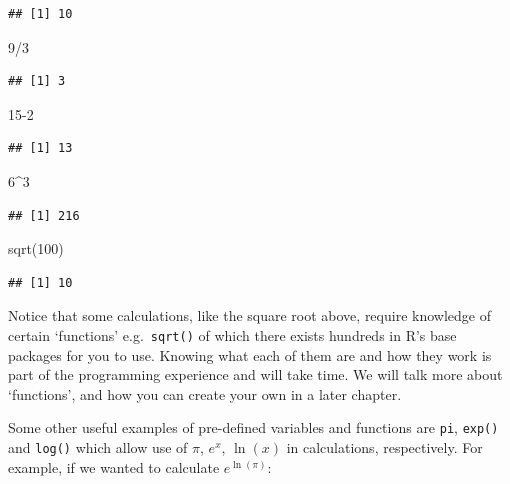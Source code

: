 \documentclass[
]{book}
\newenvironment{Shaded}{\begin{snugshade}}{\end{snugshade}}
\newcommand{\DecValTok}[1]{\textcolor[rgb]{0.00,0.00,0.81}{#1}}
\newcommand{\FunctionTok}[1]{\textcolor[rgb]{0.00,0.00,0.00}{#1}}
\newcommand{\NormalTok}[1]{#1}
\newcommand{\SpecialCharTok}[1]{\textcolor[rgb]{0.00,0.00,0.00}{#1}}
\theoremstyle{definition}
\theoremstyle{definition}
\theoremstyle{definition}
\theoremstyle{definition}
\theoremstyle{remark}
\begin{document}
\begin{verbatim}
## [1] 10
\end{verbatim}

\begin{Shaded}
\begin{Highlighting}[]
\DecValTok{9}\SpecialCharTok{/}\DecValTok{3}
\end{Highlighting}
\end{Shaded}

\begin{verbatim}
## [1] 3
\end{verbatim}

\begin{Shaded}
\begin{Highlighting}[]
\DecValTok{15{-}2}
\end{Highlighting}
\end{Shaded}

\begin{verbatim}
## [1] 13
\end{verbatim}

\begin{Shaded}
\begin{Highlighting}[]
\DecValTok{6}\SpecialCharTok{\^{}}\DecValTok{3}
\end{Highlighting}
\end{Shaded}

\begin{verbatim}
## [1] 216
\end{verbatim}

\begin{Shaded}
\begin{Highlighting}[]
\FunctionTok{sqrt}\NormalTok{(}\DecValTok{100}\NormalTok{)}
\end{Highlighting}
\end{Shaded}

\begin{verbatim}
## [1] 10
\end{verbatim}

Notice that some calculations, like the square root above, require knowledge of certain `functions' e.g.~\texttt{sqrt()} of which there exists hundreds in R's base packages for you to use. Knowing what each of them are and how they work is part of the programming experience and will take time. We will talk more about `functions', and how you can create your own in a later chapter.

Some other useful examples of pre-defined variables and functions are \texttt{pi}, \texttt{exp()} and \texttt{log()} which allow use of \(\pi\), \(e^x\), \(\ln(x)\) in calculations, respectively. For example, if we wanted to calculate \(e^{\ln(\pi)}\):
\end{document}
